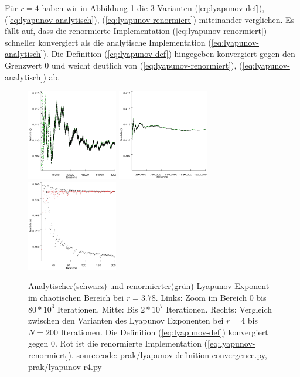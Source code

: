 \documentclass[12pt,a4paper]{article}
\begin{document}
Für $r=4$ haben wir in Abbildung \ref{fig:lyapunov-chaos} die 3 Varianten (\ref{eq:lyapunov-def}), (\ref{eq:lyapunov-analytisch}), (\ref{eq:lyapunov-renormiert}) miteinander verglichen. Es fällt auf, dass die renormierte Implementation (\ref{eq:lyapunov-renormiert}) schneller konvergiert als die analytische Implementation (\ref{eq:lyapunov-analytisch}). 
Die Definition (\ref{eq:lyapunov-def}) hingegeben konvergiert gegen den Grenzwert 0 und weicht deutlich von (\ref{eq:lyapunov-renormiert}), (\ref{eq:lyapunov-analytisch}) ab.
\begin{figure}[!htbp]
\centering
\includegraphics[height=150px]{lya378-zoom}
\includegraphics[height=150px]{lya378}
\includegraphics[height=150px, width=150px]{lyapunov_r4}
\caption{Analytischer(schwarz) und renormierter(grün) Lyapunov Exponent im chaotischen Bereich bei $r=3.78$. Links: Zoom im Bereich 0 bis $80*10^3$ Iterationen. Mitte: Bis $2*10^7$ Iterationen. Rechts: Vergleich zwischen den Varianten des Lyapunov Exponenten bei $r=4$ bis $N=200$ Iterationen. Die Definition (\ref{eq:lyapunov-def}) konvergiert gegen 0. Rot ist die renormierte Implementation (\ref{eq:lyapunov-renormiert}). sourcecode: prak/lyapunov-definition-convergence.py, prak/lyapunov-r4.py}
\label{fig:lyapunov-chaos}
\end{figure}
\end{document}
